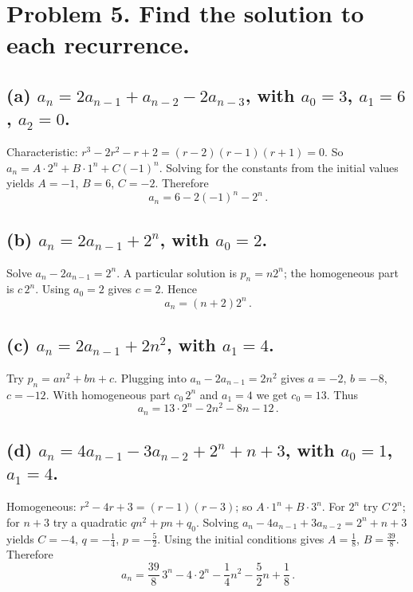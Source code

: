 \section*{Problem 5. Find the solution to each recurrence.}

\subsection*{(a) $a_n=2a_{n-1}+a_{n-2}-2a_{n-3}$, with $a_0=3$, $a_1=6$, $a_2=0$.}
Characteristic: $r^3-2r^2-r+2=(r-2)(r-1)(r+1)=0$.
So $a_n=A\cdot2^n+B\cdot1^n+C(-1)^n$. Solving for the constants from the
initial values yields $A=-1$, $B=6$, $C=-2$. Therefore
\[
\boxed{\,a_n=6-2(-1)^n-2^n\,}.
\]

\subsection*{(b) $a_n=2a_{n-1}+2^n$, with $a_0=2$.}
Solve $a_n-2a_{n-1}=2^n$. A particular solution is $p_n=n2^n$; the homogeneous
part is $c\,2^n$. Using $a_0=2$ gives $c=2$. Hence
\[
\boxed{\,a_n=(n+2)2^n\,}.
\]

\subsection*{(c) $a_n=2a_{n-1}+2n^2$, with $a_1=4$.}
Try $p_n=an^2+bn+c$. Plugging into $a_n-2a_{n-1}=2n^2$ gives
$a=-2$, $b=-8$, $c=-12$. With homogeneous part $c_0\,2^n$ and $a_1=4$ we get
$c_0=13$. Thus
\[
\boxed{\,a_n=13\cdot2^n-2n^2-8n-12\,}.
\]

\subsection*{(d) $a_n=4a_{n-1}-3a_{n-2}+2^n+n+3$, with $a_0=1$, $a_1=4$.}
Homogeneous: $r^2-4r+3=(r-1)(r-3)$; so $A\cdot1^n+B\cdot3^n$.
For $2^n$ try $C\,2^n$; for $n+3$ try a quadratic $qn^2+pn+q_0$.
Solving $a_n-4a_{n-1}+3a_{n-2}=2^n+n+3$ yields $C=-4$, $q=-\tfrac14$, $p=-\tfrac52$.
Using the initial conditions gives $A=\tfrac18$, $B=\tfrac{39}{8}$. Therefore
\[
\boxed{\,a_n=\frac{39}{8}\,3^n-4\cdot2^n-\frac14 n^2-\frac52 n+\frac18\,}.
\]
